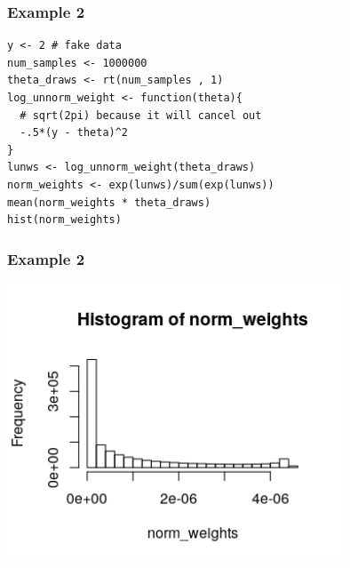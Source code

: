 \documentclass{beamer}
\begin{document}
\begin{frame}[fragile]
\frametitle{Example 2}


\begin{verbatim}
y <- 2 # fake data
num_samples <- 1000000
theta_draws <- rt(num_samples , 1)
log_unnorm_weight <- function(theta){ 
  # sqrt(2pi) because it will cancel out 
  -.5*(y - theta)^2
}
lunws <- log_unnorm_weight(theta_draws)
norm_weights <- exp(lunws)/sum(exp(lunws))
mean(norm_weights * theta_draws)
hist(norm_weights)
\end{verbatim}


\end{frame}

\begin{frame}[fragile]
\frametitle{Example 2}

\begin{center}
\includegraphics[width=100mm]{is_weights.png}
\end{center}

\end{frame}
\end{document}
